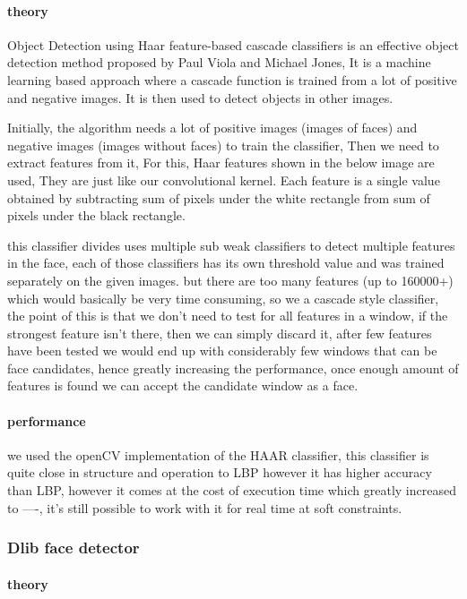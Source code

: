\paragraph{theory}
Object Detection using Haar feature-based cascade classifiers is an effective object detection method proposed by Paul Viola and Michael Jones\cite{haar}, It is a machine learning based approach where a cascade function is trained from a lot of positive and negative images. It is then used to detect objects in other images.

Initially, the algorithm needs a lot of positive images (images of faces) and negative images (images without faces) to train the classifier, Then we need to extract features from it, For this, Haar features shown in the below image are used, They are just like our convolutional kernel. Each feature is a single value obtained by subtracting sum of pixels under the white rectangle from sum of pixels under the black rectangle.

this classifier divides uses multiple sub weak classifiers to detect multiple features in the face, each of those classifiers has its own threshold value and was trained separately on the given images.
but there are too many features (up to 160000+) which would basically be very time consuming, so we a cascade style classifier, the point of this is that we don't need to test for all features in a window, if the strongest feature isn't there, then we can simply discard it, after few features have been tested we would end up with considerably few windows that can be face candidates, hence greatly increasing the performance, once enough amount of features is found we can accept the candidate window as a face.

\paragraph{performance}
we used the openCV implementation of the HAAR classifier, this classifier is quite close in structure and operation to LBP however it has higher accuracy than LBP, however it comes at the cost of execution time which greatly increased to ----, it's still possible to work with it for real time at soft constraints.


\subsubsection{Dlib face detector}
\paragraph{theory}
